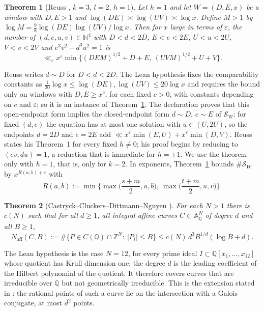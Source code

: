 \documentclass[11pt,reqno]{amsart}
\newtheorem{theorem}{Theorem}[section]
\theoremstyle{definition}
\theoremstyle{remark}
\numberwithin{equation}{section}
\newcommand{\Z}{\mathbb Z}
\newcommand{\N}{\mathbb N}
\newcommand{\Q}{\mathbb Q}
\newcommand{\A}{\mathbb A}
\newcommand{\ub}{\bar u}
\newcommand{\vb}{\bar v}
\begin{document}
\begin{theorem}[{Reuss \cite[Theorem~1]{Reuss}, $k=3$, $l=2$, $h=1$}]\label{thm:reuss1}
Let $h=1$ and let $W=(D,E,x)$ be a window with $D,E>1$ and
$\log(DE)\asymp\log(UV)\asymp\log x$. Define $M>1$ by
$\log M=\frac98\log(DE)\log(UV)/\log x$. Then for $x$ large in terms of
$\varepsilon$, the number of $(d,e,u,v)\in\N^4$ with $D<d<2D$, $E<e<2E$,
$U<u<2U$, $V<v<2V$ and $e^3v^2-d^3u^2=1$ is
\[
\ll_\varepsilon x^{\varepsilon}\min\{(DEM)^{1/2}+D+E,\ (UVM)^{1/2}+U+V\}.
\]
\end{theorem}
Reuss writes $d\sim D$ for $D<d<2D$. The Lean hypothesis fixes the
comparability constants as $\frac1{20}\log x\le\log(DE),\log(UV)\le20\log x$
and requires the bound only on windows with $D,E\ge x^c$, for each fixed
$c>0$, with constants depending on $c$ and $\varepsilon$; so it is an instance
of Theorem~\ref{thm:reuss1}. The declaration 
proves that this open-endpoint form implies the closed-endpoint form
$d\sim D$, $e\sim E$ of $\mathcal S_W$: for fixed $(d,e)$ the equation has at
most one solution with $u\in(U,2U)$, so the endpoints $d=2D$ and $e=2E$ add
$\ll x^{\varepsilon}\min(E,U)+x^\varepsilon\min(D,V)$. Reuss states his
Theorem~1 for every fixed $h\ne0$; his proof begins by reducing to
$(ev,du)=1$, a reduction that is immediate for $h=\pm1$. We use the theorem
only with $h=1$, that is, only for $k=2$. In exponents, Theorem~\ref{thm:reuss1} bounds $\#\mathcal S_W$ by
$x^{R(a,b)+\varepsilon}$ with
\begin{equation}\label{eq:R}
R(a,b):=\min\Big\{\max\Big(\frac{s+m}2,a,b\Big),\ \max\Big(\frac{t+m}2,\ub,\vb\Big)\Big\}.
\end{equation}

\begin{theorem}[{Castryck--Cluckers--Dittmann--Nguyen \cite[Theorem~3]{CCDN}}]\label{thm:ccdn}
For each $N>1$ there is $c(N)$ such that for all $d\ge1$, all integral affine
curves $C\subset\A^N_{\overline{\Q}}$ of degree $d$ and all $B\ge1$,
\[
N_{\mathrm{aff}}(C,B):=\#\{P\in C(\Q)\cap\Z^N:\ |P_i|\le B\}\le c(N)\,d^3B^{1/d}(\log B+d).
\]
\end{theorem}
The Lean hypothesis is the case $N=12$, for every prime ideal
$I\subset\Q[x_1,\dots,x_{12}]$ whose quotient has Krull dimension one; the
degree $d$ is the leading coefficient of the Hilbert polynomial of the
quotient. It therefore covers curves that are irreducible over $\Q$ but not
geometrically irreducible. This is the extension stated in \cite[Corollary~4.1.4
and Remark~4.1.5]{CCDN}: the rational points of such a curve lie on the
intersection with a Galois conjugate, at most $d^2$ points.
\end{document}
